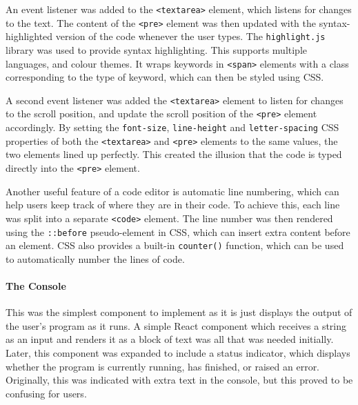 \documentclass[../main.tex]{subfiles}
\begin{document}
                    An event listener was added to the \texttt{<textarea>} element, which listens
                        for changes to the text.
                    The content of the \texttt{<pre>} element was then updated with the
                        syntax-highlighted version of the code whenever the user types.
                    The \texttt{highlight.js} library was used to provide syntax highlighting.
                    This supports multiple languages, and colour themes.
                    It wraps keywords in \texttt{<span>} elements with a class corresponding to the
                        type of keyword, which can then be styled using CSS.

                    A second event listener was added the \texttt{<textarea>} element to listen for
                        changes to the scroll position, and update the scroll position of the
                        \texttt{<pre>} element accordingly.
                    By setting the \texttt{font-size}, \texttt{line-height} and
                        \texttt{letter-spacing} CSS properties of both the \texttt{<textarea>} and
                        \texttt{<pre>} elements to the same values, the two elements lined up
                        perfectly.
                    This created the illusion that the code is typed directly into the
                        \texttt{<pre>} element.

                    Another useful feature of a code editor is automatic line numbering, which can
                        help users keep track of where they are in their code.
                    To achieve this, each line was split into a separate \texttt{<code>} element.
                    The line number was then rendered using the \texttt{::before} pseudo-element in
                        CSS, which can insert extra content before an element.
                    CSS also provides a built-in \texttt{counter()} function, which can be used to
                        automatically number the lines of code.

                \paragraph{The Console}
                    This was the simplest component to implement as it is just displays the output
                        of the user's program as it runs.
                    A simple React component which receives a string as an input and renders it as
                        a block of text was all that was needed initially.
                    Later, this component was expanded to include a status indicator, which
                        displays whether the program is currently running, has finished, or raised an
                        error.
                    Originally, this was indicated with extra text in the console, but this proved
                        to be confusing for users.
\end{document}
